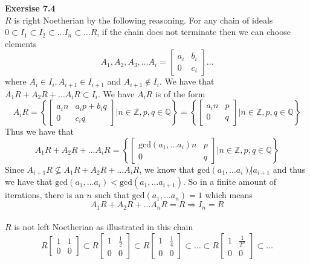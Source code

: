 \documentclass[12pt]{article}
\newenvironment{ques}[1]{\textbf{Exersise #1}\vspace{1 mm}\\ }{\bigskip}
\theoremstyle{definition}
\renewcommand{\l}{\left }
\renewcommand{\r}{\right }
\newcommand{\Q}{\mathbb Q}
\newcommand{\Z}{\mathbb Z}
\begin{document}
\begin{ques}{7.4}
	$R$ is right Noetherian by the following reasoning. For any chain of ideals $0
	\subset I_1 \subset I_2 \subset \dots I_n \subset \dots R$, if the chain
	does not terminate then we can choose elements
	$$A_1, 	A_2, A_3, \dots 
	A_i = \begin{bmatrix} 
	a_i & b_i \\ 
	0 & c_i
	\end{bmatrix} \dots
	$$
	where $A_i \in I_i, A_{i+1} \in I_{i+1}$ and $A_{i+1} \notin I_i$. We have
	that $A_1R + A_2R + \dots A_iR \subset I_i$. We have $A_iR$ is of the form
	$$A_iR = \l\{\begin{bmatrix} 
	a_in & a_ip + b_iq \\ 
	0 & c_iq
	\end{bmatrix} | n \in \Z, p,q \in \Q \r\} = 
	\l \{ \begin{bmatrix} 
	a_in & p \\ 
	0 & q
	\end{bmatrix} | n \in \Z, p,q \in \Q\r\} 
	$$
	Thus we have that 
	$$A_1R + A_2R + \dots A_iR = 
	\l \{ \begin{bmatrix} 
	\text {gcd}(a_1, \dots a_i)n & p \\ 
	0 & q
	\end{bmatrix} | n \in \Z, p,q \in \Q\r\} 
	$$
	Since $A_{i+1}R \not \subseteq A_1R + A_2R + \dots A_iR$, we know that $\text
	{gcd}(a_1, \dots a_i) \not |a_{i+1}$ and thus we have that $\text
	{gcd}(a_1, \dots a_i) < \text {gcd}(a_1, \dots a_{i+1})$. So in a finite
	amount of iterations, there is an $n$ such that $\text {gcd}(a_1, \dots
	a_n) = 1$ which means
	$$A_1R + A_2R + \dots A_nR = R \Rightarrow I_n = R$$
	\\
	$R$ is not left Noetherian as illustrated in this chain
	$$R \begin{bmatrix} 
	1 & 1 \\ 
	0 & 0
	\end{bmatrix}
	\subset
	R \begin{bmatrix} 
	1 & \frac 1 2 \\ 
	0 & 0
	\end{bmatrix}
	\subset
	R \begin{bmatrix} 
	1 & \frac 1 4 \\ 
	0 & 0
	\end{bmatrix} 
	\subset
	\dots \subset
	R \begin{bmatrix} 
	1 & \frac 1 {2^n} \\ 
	0 & 0
	\end{bmatrix}  \subset \dots$$

\end{ques}
\end{document}
